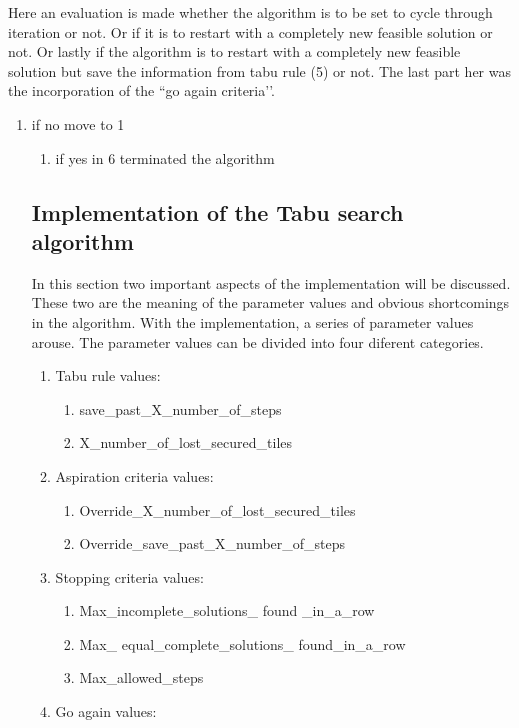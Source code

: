 \begin{enumerate}
Here an evaluation is made whether the algorithm is to be set to cycle through iteration or not. Or if it is to restart with a completely new feasible solution or not. 
Or lastly if the algorithm is to restart with a completely new feasible solution but save the information from tabu rule (5) or not. The last part her was the incorporation of the ``go again criteria’’.
\begin{enumerate}
\item{} if no move to 1
 \begin{enumerate}
\item{} if yes in 6 terminated the algorithm
\end{enumerate}

\subsection{Implementation of the Tabu search algorithm}
In this section two important aspects of the implementation will be discussed. These two are the meaning of the parameter values and obvious shortcomings in the algorithm. With the implementation, a series of parameter values arouse. The parameter values can be divided into four diferent categories.
\begin{enumerate}
\item{} Tabu rule values:
\begin{enumerate}
\item{} save\_past\_X\_number\_of\_steps
\item{} X\_number\_of\_lost\_secured\_tiles
\end{enumerate} 
\item{} Aspiration criteria values:
\begin{enumerate}
\item{} Override\_X\_number\_of\_lost\_secured\_tiles
\item{} Override\_save\_past\_X\_number\_of\_steps
\end{enumerate} 
\item{} Stopping criteria values:
\begin{enumerate}
\item{} Max\_incomplete\_solutions\_ found \_in\_a\_row
\item{} Max\_ equal\_complete\_solutions\_ found\_in\_a\_row
\item{} Max\_allowed\_steps
\end{enumerate} 
\item{} Go again values:
\begin{enumerate}

\end{enumerate}
\end{enumerate}
\end{enumerate}
\end{enumerate}
